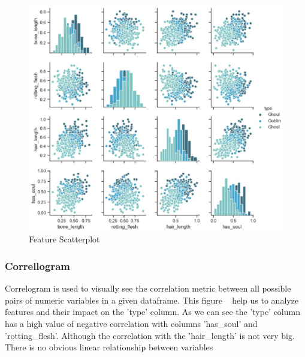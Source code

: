 \begin{figure}[htbp]
	\centering
	\includegraphics[scale=0.3]{figures/pairplot.eps}
	\caption{Feature Scatterplot}\label{fig:feature_scatterplot}
\end{figure}


\subsubsection{Correllogram}


Correlogram is used to 
visually see the correlation metric 
between all possible pairs of numeric variables 
in a given dataframe. 
This figure ~ 
help us to analyze features 
and their impact on the 'type' column. 
As we can see the 'type' column 
has a high value of negative correlation 
with columns 'has_soul' and 'rotting_flesh'. 
Although the correlation 
with the 'hair_length' is not very big.
There is no obvious linear relationship 
between variables

